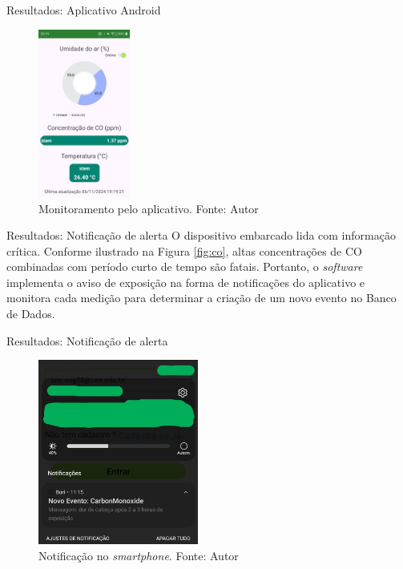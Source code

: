 \documentclass[12pt]{beamer}
\begin{document}
    \begin{frame}{Resultados: Aplicativo Android}
        \begin{figure}[ht]
            \centering
            \includegraphics[width=0.27\textwidth]{img/app.png}
            \caption{Monitoramento pelo aplicativo. Fonte: Autor}\label{fig:software}
        \end{figure}
    \end{frame}

    \begin{frame}{Resultados: Notificação de alerta}
        O dispositivo embarcado lida com informação crítica. Conforme ilustrado na Figura \ref{fig:co}, 
        altas concentrações de CO combinadas com período curto de tempo são fatais. Portanto, o \textit{software} 
        implementa o aviso de exposição na forma de notificações do aplicativo e monitora cada medição para 
        determinar a criação de um novo evento no Banco de Dados.
    \end{frame}

    \begin{frame}{Resultados: Notificação de alerta}
        \begin{figure}[ht]
            \centering
            \includegraphics[width=0.47\textwidth]{img/notificação.jpg}
            \caption{Notificação no \textit{smartphone}. Fonte: Autor}\label{fig:notification}
        \end{figure}
    \end{frame}
\end{document}
